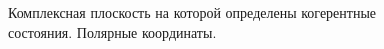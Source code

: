 \begin{figure}
\centering

\caption{Комплексная плоскость на которой определены когерентные
  состояния. Полярные координаты.}
\label{figCh1_Coh}
\end{figure}
